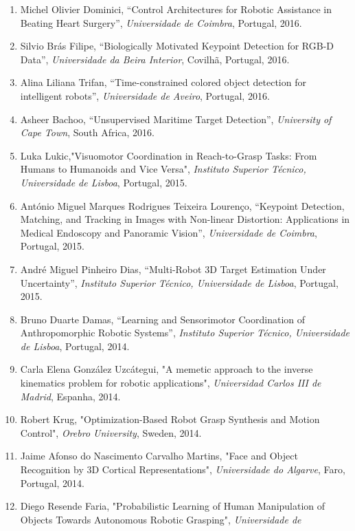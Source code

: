 \begin{enumerate}
  Jorge Manuel Soares de Almeida, ``Active Tracking of Dynamic
  Multivariate Agents using Vectorial Range Data'', \emph{Universidade
  de Aveiro}, Portugal, 2016.
\item
  Michel Olivier Dominici, ``Control Architectures for Robotic
  Assistance in Beating Heart Surgery'', \emph{Universidade de Coimbra},
  Portugal, 2016.
\item
  Silvio Brás Filipe, ``Biologically Motivated Keypoint Detection for
  RGB-D Data'', \emph{Universidade da Beira Interior}, Covilhã,
  Portugal, 2016.
\item
  Alina Liliana Trifan, ``Time-constrained colored object detection for
  intelligent robots'', \emph{Universidade de Aveiro}, Portugal, 2016.
\item
  Asheer Bachoo, ``Unsupervised Maritime Target Detection'',
  \emph{University of Cape Town}, South Africa, 2016.
\item
  Luka Lukic,"Visuomotor Coordination in Reach-to-Grasp Tasks: From
  Humans to Humanoids and Vice Versa", \emph{Instituto Superior Técnico,
  Universidade de Lisboa}, Portugal, 2015.
\item
  António Miguel Marques Rodrigues Teixeira Lourenço, ``Keypoint
  Detection, Matching, and Tracking in Images with Non-linear
  Distortion: Applications in Medical Endoscopy and Panoramic Vision'',
  \emph{Universidade de Coimbra}, Portugal, 2015.
\item
  André Miguel Pinheiro Dias, ``Multi-Robot 3D Target Estimation Under
  Uncertainty'', \emph{Instituto Superior Técnico, Universidade de
  Lisboa}, Portugal, 2015.
\item
  Bruno Duarte Damas, ``Learning and Sensorimotor Coordination of
  Anthropomorphic Robotic Systems'', \emph{Instituto Superior Técnico,
  Universidade de Lisboa}, Portugal, 2014.
\item
  Carla Elena González Uzcátegui, "A memetic approach to the inverse
  kinematics problem for robotic applications", \emph{Universidad Carlos
  III de Madrid}, Espanha, 2014.
\item
  Robert Krug, "Optimization-Based Robot Grasp Synthesis and Motion
  Control", \emph{Orebro University}, Sweden, 2014.
\item
  Jaime Afonso do Nascimento Carvalho Martins, "Face and Object
  Recognition by 3D Cortical Representations", \emph{Universidade do
  Algarve}, Faro, Portugal, 2014.
\item
  Diego Resende Faria, "Probabilistic Learning of Human Manipulation of
  Objects Towards Autonomous Robotic Grasping", \emph{Universidade de
}
\end{enumerate}
